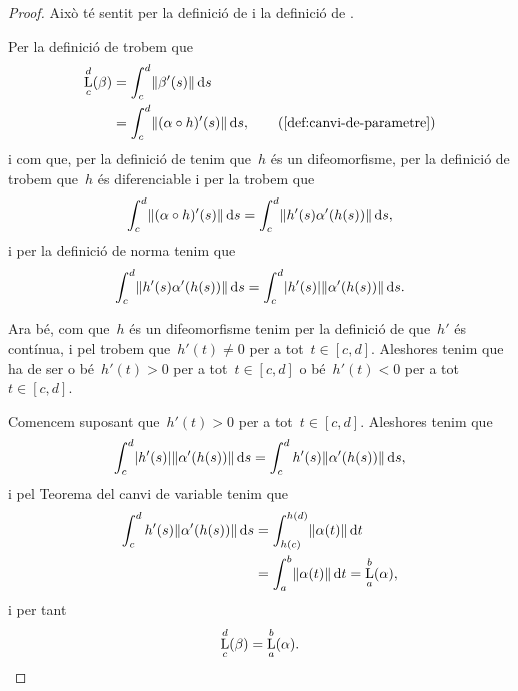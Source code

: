 \documentclass[../../main.tex]{subfiles}
\begin{document}
    \begin{proof}
        Això té sentit per la definició de  i la definició de .

        Per la definició de  trobem que
        \begin{align*}
            \Long_{c}^{d}(\beta)&=\int_{c}^{d}\norm{\beta'(s)}\diff s \\
            &=\int_{c}^{d}\norm{(\alpha\circ h)'(s)}\diff s, \tag{\ref{def:canvi-de-parametre}}
        \end{align*}
        i com que, per la definició de  tenim que~\(h\) és un difeomorfisme, per la definició de  trobem que~\(h\) és diferenciable i per la  trobem que
        \[
            \int_{c}^{d}\norm{(\alpha\circ h)'(s)}\diff s=\int_{c}^{d}\norm{h'(s)\alpha'(h(s))}\diff s,
        \]
        i per la definició de norma tenim que%
        \[
            \int_{c}^{d}\norm{h'(s)\alpha'(h(s))}\diff s=\int_{c}^{d}\abs{h'(s)}\norm{\alpha'(h(s))}\diff s.
        \]

        Ara bé, com que~\(h\) és un difeomorfisme tenim per la definició de  que~\(h'\) és contínua, i pel \corollari{}  trobem que~\(h'(t)\neq0\) per a tot~\(t\in[c,d]\).
        Aleshores tenim que ha de ser o bé~\(h'(t)>0\) per a tot~\(t\in[c,d]\) o bé~\(h'(t)<0\) per a tot~\(t\in[c,d]\).

        Comencem suposant que~\(h'(t)>0\) per a tot~\(t\in[c,d]\).
        Aleshores tenim que
        \[
            \int_{c}^{d}\abs{h'(s)}\norm{\alpha'(h(s))}\diff s=\int_{c}^{d}h'(s)\norm{\alpha'(h(s))}\diff s,
        \]
        i pel Teorema del canvi de variable tenim que %
        \begin{align*}
            \int_{c}^{d}h'(s)\norm{\alpha'(h(s))}\diff s&=\int_{h(c)}^{h(d)}\norm{\alpha(t)}\diff t \\
            &=\int_{a}^{b}\norm{\alpha(t)}\diff t=\Long_{a}^{b}(\alpha),
        \end{align*}
        i per tant
        \[
            \operatorname*{L}_{c}^{d}(\beta)=\operatorname*{L}_{a}^{b}(\alpha).
        \]


\end{proof}
\end{document}
